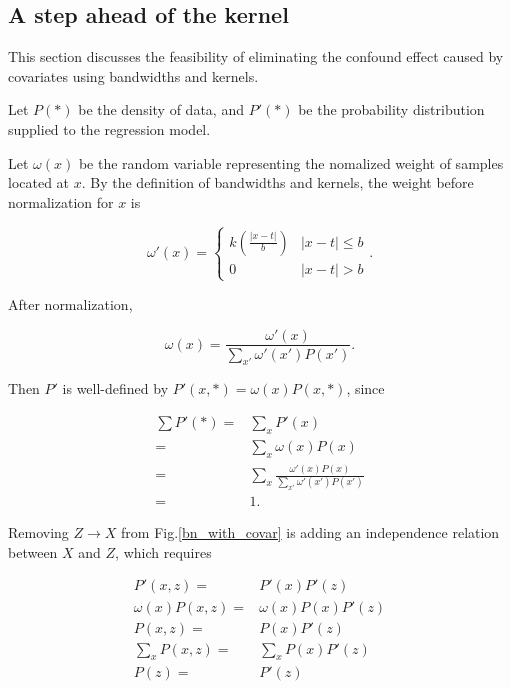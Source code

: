 \documentclass[a4 paper,12pt]{article}
\begin{document}
\subsection{A step ahead of the kernel}

This section discusses the feasibility of eliminating the confound effect caused by covariates using bandwidths and kernels.

Let $P(*)$ be the density of data,
and $P'(*)$ be the probability distribution supplied to the regression model.

Let $\omega(x)$ be the random variable representing the nomalized weight of samples located at $x$.
By the definition of bandwidths and kernels,
the weight before normalization for $x$ is

\begin{equation}
   \omega'(x)=\begin{cases}
      k\left(\frac{\left|x-t\right|}{b}\right)&\left|x-t\right|\le b\\
      0&\left|x-t\right|>b
   \end{cases}.
\end{equation}

After normalization,

\begin{equation}
   \omega(x)=\frac{\omega'(x)}{\sum_{x'}\omega'(x')P(x')}.
\end{equation}

Then $P'$ is well-defined by $P'(x,*)=\omega(x)P(x,*)$, since

\begin{align}
   \sum P'(*)=&\sum_xP'(x)\\
   =&\sum_x\omega(x)P(x)\\
   =&\sum_x\frac{\omega'(x)P(x)}{\sum_{x'}\omega'(x')P(x')}\\
   =&1.
\end{align}

Removing $Z\to X$ from Fig.\ref{bn_with_covar} is adding an independence relation between $X$ and $Z$,
which requires

\begin{align}
   P'(x,z)=&P'(x)P'(z)\\
   \omega(x)P(x,z)=&\omega(x)P(x)P'(z)\\
   P(x,z)=&P(x)P'(z)\label{eqn:indep}\\
   \sum_x P(x,z)=&\sum_xP(x)P'(z)\\
   P(z)=&P'(z)\label{eqn:z_zpai}
\end{align}
\end{document}
